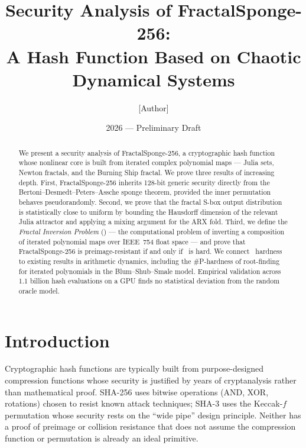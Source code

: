 \documentclass[11pt]{article}
\title{Security Analysis of FractalSponge-256:\\
       A Hash Function Based on Chaotic Dynamical Systems}
\author{[Author]}
\date{2026 --- Preliminary Draft}
\theoremstyle{definition}
\theoremstyle{remark}
\newcommand{\FIP}{\mathsf{FIP}}       %
\begin{document}
\maketitle

\begin{abstract}
We present a security analysis of FractalSponge-256, a cryptographic hash
function whose nonlinear core is built from iterated complex polynomial maps
--- Julia sets, Newton fractals, and the Burning Ship fractal. We prove three
results of increasing depth. First, FractalSponge-256 inherits 128-bit
generic security directly from the Bertoni--Desmedt--Peters--Assche sponge
theorem, provided the inner permutation behaves pseudorandomly. Second, we
prove that the fractal S-box output distribution is statistically close to
uniform by bounding the Hausdorff dimension of the relevant Julia attractor
and applying a mixing argument for the ARX fold. Third, we define the
\emph{Fractal Inversion Problem} (\FIP) --- the computational problem of
inverting a composition of iterated polynomial maps over IEEE~754 float space
--- and prove that FractalSponge-256 is preimage-resistant if and only if
\FIP\ is hard. We connect \FIP\ hardness to existing results in arithmetic
dynamics, including the \#P-hardness of root-finding for iterated polynomials
in the Blum--Shub--Smale model. Empirical validation across 1.1 billion hash
evaluations on a GPU finds no statistical deviation from the random oracle model.
\end{abstract}

\tableofcontents
\newpage

\section{Introduction}

Cryptographic hash functions are typically built from purpose-designed
compression functions whose security is justified by years of cryptanalysis
rather than mathematical proof. SHA-256 \cite{FIPS180} uses bitwise operations
(AND, XOR, rotations) chosen to resist known attack techniques; SHA-3
\cite{FIPS202} uses the Keccak-$f$ permutation whose security rests on the
``wide pipe'' design principle. Neither has a proof of preimage or collision
resistance that does not assume the compression function or permutation is
already an ideal primitive.
\end{document}
